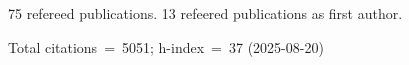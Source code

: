 75 refereed publications. 13 refeered publications as first author.

Total citations~=~5051; h-index~=~37 (2025-08-20)